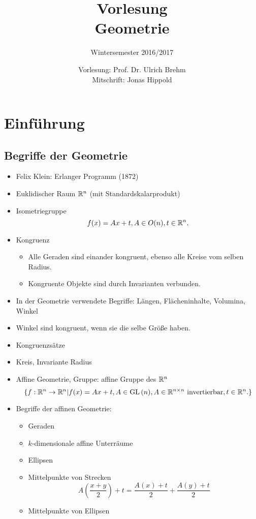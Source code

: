 \documentclass[
 a4paper,
 12pt,
 parskip=half
 ]{scrartcl}
\title{Vorlesung\\Geometrie}
\subtitle{Wintersemester 2016/2017}
\author{Vorlesung: Prof. Dr. Ulrich Brehm\\Mitschrift: Jonas Hippold}
\theoremstyle{plain}
\theoremstyle{definition}
\numberwithin{equation}{section}
\begin{document}
\maketitle

\tableofcontents

\setcounter{secnumdepth}{0}
\section{Einführung}
\subsection{Begriffe der Geometrie}
\begin{itemize}
 \item Felix Klein: Erlanger Programm (1872)
 \item Euklidischer Raum $\mathbb{R}^n$ (mit Standardskalarprodukt)
 \item Isometriegruppe
  \[ f(x) = Ax + t, A \in O(n), t \in \mathbb{R}^n. \]
 \item Kongruenz
  \begin{itemize} 
   \item Alle Geraden sind einander kongruent, ebenso alle Kreise vom selben Radius.
   \item Kongruente Objekte sind durch Invarianten verbunden.
  \end{itemize}
 \item In der Geometrie verwendete Begriffe: Längen, Flächeninhalte, Volumina, Winkel
 \item Winkel sind kongruent, wenn sie die selbe Größe haben.
 \item Kongruenzsätze
 \item Kreis, Invariante Radius
 \item Affine Geometrie, Gruppe: affine Gruppe des $\mathbb{R}^n$
  \[ \{ f: \mathbb{R}^n \to \mathbb{R}^n | f(x) = Ax + t, A \in \mathrm{GL}\,(n), A \in \mathbb{R}^{n \times n} \text{ invertierbar}, t \in \mathbb{R}^n. \} \]
 \item Begriffe der affinen Geometrie:
  \begin{itemize}
   \item Geraden
   \item $k$-dimensionale affine Unterräume
   \item Ellipsen
   \item Mittelpunkte von Strecken 
    \[ A \left( \frac{x+y}{2} \right) + t = \frac{A(x) + t}{2} + \frac{A(y) + t}{2} \]
   \item Mittelpunkte von Ellipsen
  \end{itemize}

\end{itemize}
\end{document}
